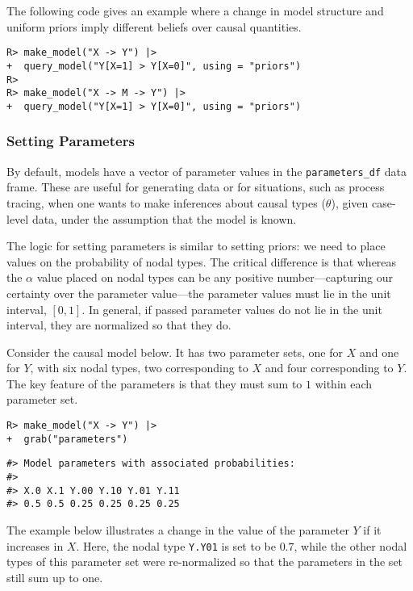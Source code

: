 \documentclass[
  11pt,
  article]{jss}
\begin{document}
The following code gives an example where a change in model structure
and uniform priors imply different beliefs over causal quantities.

\begin{verbatim}
R> make_model("X -> Y") |>
+  query_model("Y[X=1] > Y[X=0]", using = "priors")
R> 
R> make_model("X -> M -> Y") |>
+  query_model("Y[X=1] > Y[X=0]", using = "priors")
\end{verbatim}

\subsubsection{Setting Parameters}\label{parameters}

By default, models have a vector of parameter values in the
\texttt{parameters\_df} data frame. These are useful for generating data
or for situations, such as process tracing, when one wants to make
inferences about causal types (\(\theta\)), given case-level data, under
the assumption that the model is known.

The logic for setting parameters is similar to setting priors: we need
to place values on the probability of nodal types. The critical
difference is that whereas the \(\alpha\) value placed on nodal types
can be any positive number---capturing our certainty over the parameter
value---the parameter values must lie in the unit interval, \([0,1]\).
In general, if passed parameter values do not lie in the unit interval,
they are normalized so that they do.

Consider the causal model below. It has two parameter sets, one for
\(X\) and one for \(Y\), with six nodal types, two corresponding to
\(X\) and four corresponding to \(Y\). The key feature of the parameters
is that they must sum to \(1\) within each parameter set.

\begin{verbatim}
R> make_model("X -> Y") |> 
+  grab("parameters")
\end{verbatim}

\begin{verbatim}
#> Model parameters with associated probabilities: 
#> 
#> X.0 X.1 Y.00 Y.10 Y.01 Y.11
#> 0.5 0.5 0.25 0.25 0.25 0.25
\end{verbatim}

The example below illustrates a change in the value of the parameter
\(Y\) if it increases in \(X\). Here, the nodal type \texttt{Y.Y01} is
set to be \(0.7\), while the other nodal types of this parameter set
were re-normalized so that the parameters in the set still sum up to
one.
\end{document}
